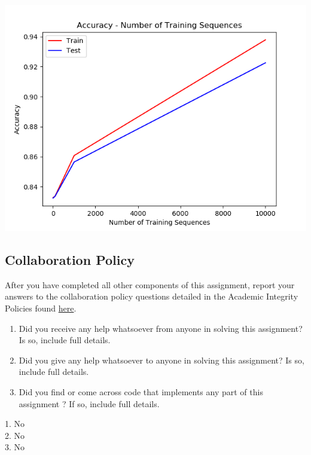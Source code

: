 \documentclass{article}
\begin{document}
 \begin{tcolorbox}[fit,height=13cm, width=17cm, blank, borderline={1pt}{-2pt}]
    \includegraphics{accuracy_plot.png}
 \end{tcolorbox}

\subsection{Collaboration Policy}
After you have completed all other components of this assignment, report your answers to the collaboration policy questions detailed in the Academic Integrity Policies found \href{http://www.cs.cmu.edu/~mgormley/courses/10601bd-f18/about.html#7-academic-integrity-policies}{here}.
    \begin{enumerate}
        \item Did you receive any help whatsoever from anyone in solving this assignment? Is so, include full details.
        \item Did you give any help whatsoever to anyone in solving this assignment? Is so, include full details.
        \item Did you find or come across code that implements any part of this assignment ? If so, include full details.
    \end{enumerate}

\begin{tcolorbox}[fit,height=10cm, width=17cm, blank, borderline={1pt}{-2pt}]
    1. No\\
    2. No\\
    3. No
    \end{tcolorbox}
\end{document}
